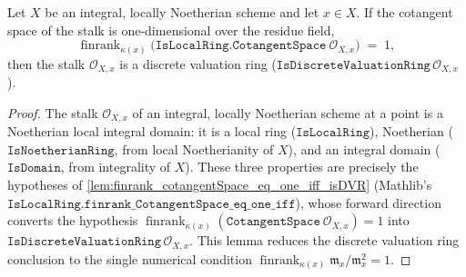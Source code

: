 \begin{lemma}

  \label{lem:isDVR_stalk_of_finrank_cotangentSpace}
  Let \(X\) be an integral, locally Noetherian scheme and let \(x \in X\).
  If the cotangent space of the stalk is one-dimensional over the residue
  field,
  \[
    \operatorname{finrank}_{\kappa(x)}
      \bigl(\texttt{IsLocalRing.CotangentSpace}\ \mathcal O_{X, x}\bigr)
    \;=\; 1,
  \]
  then the stalk \(\mathcal O_{X, x}\) is a discrete valuation ring
  (\(\texttt{IsDiscreteValuationRing}\,\mathcal O_{X, x}\)).
\end{lemma}

\begin{proof}
  The stalk \(\mathcal O_{X, x}\) of an integral, locally Noetherian scheme
  at a point is a Noetherian local integral domain: it is a local ring
  (\(\texttt{IsLocalRing}\)), Noetherian (\(\texttt{IsNoetherianRing}\), from
  local Noetherianity of \(X\)), and an integral domain
  (\(\texttt{IsDomain}\), from integrality of \(X\)). These three properties
  are precisely the hypotheses of \cref{lem:finrank_cotangentSpace_eq_one_iff_isDVR}
  (Mathlib's \(\texttt{IsLocalRing.finrank\_CotangentSpace\_eq\_one\_iff}\)),
  whose forward direction converts the hypothesis
  \(\operatorname{finrank}_{\kappa(x)}
  (\texttt{CotangentSpace}\ \mathcal O_{X, x}) = 1\) into
  \(\texttt{IsDiscreteValuationRing}\,\mathcal O_{X, x}\). This lemma reduces
  the discrete valuation ring conclusion to the single numerical condition
  \(\operatorname{finrank}_{\kappa(x)} \mathfrak m_x/\mathfrak m_x^2 = 1\).
\end{proof}

